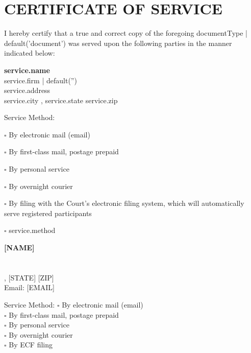 
\section*{CERTIFICATE OF SERVICE}

I hereby certify that a true and correct copy of the foregoing {{ documentType | default('document') }} was served upon the following parties in the manner indicated below:

\vspace{0.25in}

{%
{%
\textbf{{ service.name }}\\
{{ service.firm | default('') }}\\
{{ service.address }}\\
{{ service.city }}, {{ service.state }} {{ service.zip }}\\
{%

Service Method: 
{%
$\square$ By electronic mail (email)
{%
$\square$ By first-class mail, postage prepaid
{%
$\square$ By personal service
{%
$\square$ By overnight courier
{%
$\square$ By filing with the Court's electronic filing system, which will automatically serve registered participants
{%
$\square$ {{ service.method }}
{%

\vspace{0.25in}

{%
{%
\textbf{[NAME]}\\
[FIRM]\\
[ADDRESS]\\
[CITY], [STATE] [ZIP]\\
Email: [EMAIL]

Service Method: $\square$ By electronic mail (email)\\
\phantom{Service Method: } $\square$ By first-class mail, postage prepaid\\
\phantom{Service Method: } $\square$ By personal service\\
\phantom{Service Method: } $\square$ By overnight courier\\
\phantom{Service Method: } $\square$ By ECF filing
{%

}}}}}}}}}}}}}
